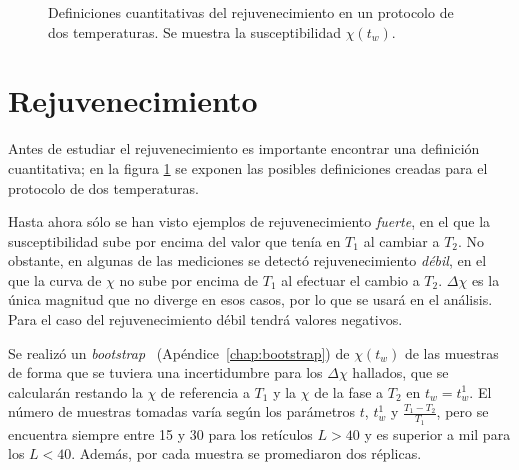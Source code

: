 \documentclass[11pt]{report}
\begin{document}
\begin{figure}
  \centering
  \caption{Definiciones cuantitativas del rejuvenecimiento en un
    protocolo de dos temperaturas. Se muestra la susceptibilidad $χ(t_w)$.}
  \label{fig:definitions}
\end{figure}


\section{Rejuvenecimiento}
Antes de estudiar el rejuvenecimiento es importante encontrar una
definición cuantitativa; en la figura \ref{fig:definitions} se
exponen las posibles definiciones creadas para el protocolo
de dos temperaturas.

Hasta ahora sólo se han visto ejemplos de rejuvenecimiento
\emph{fuerte}, en el que la susceptibilidad sube por encima del valor
que tenía en $T_1$ al cambiar a $T_2$. No obstante, en algunas de las
mediciones se detectó rejuvenecimiento \emph{débil}, en el que la
curva de $χ$ no sube por encima de $T_1$ al efectuar el cambio a
$T_2$. $Δχ$ es la única magnitud que no diverge en esos casos, por lo
que se usará en el análisis. Para el caso del rejuvenecimiento débil
tendrá valores negativos.

Se realizó un \textit{bootstrap}~\cite{boot}
(Apéndice~\ref{chap:bootstrap}) de $χ(t_w)$ de las muestras de forma
que se tuviera una incertidumbre para los $Δχ$ hallados, que se
calcularán restando la $χ$ de referencia a $T_1$ y la $χ$ de la fase a
$T_2$ en $t_w = t_w^1$. El número de muestras tomadas varía según los
parámetros $t$,  $t_w^1$ y $\frac{T_1-T_2}{T_1}$, pero se encuentra siempre
entre 15 y 30 para los retículos $L>40$ y es superior a mil para los
$L<40$. Además, por cada muestra se promediaron dos réplicas.
\end{document}
